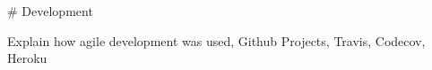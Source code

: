 \begin{markdown}

# Development

Explain how agile development was used, Github Projects, Travis, Codecov, Heroku
    
\end{markdown}